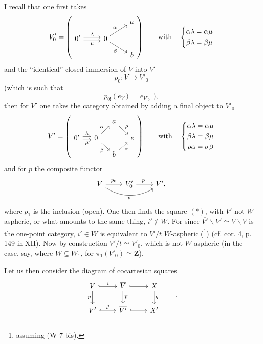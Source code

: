 \documentclass[11pt]{article}
\newcommand{\printedpage}[1]{\marginpar{\footnotesize p.~#1}}
\newcommand{\msp}[1]{\marginpar{\footnotesize [#1]}}
\begin{document}
I recall that one first takes
\printedpage{11}
\[
V'_0 = \left(
\begin{tikzcd}[row sep=small]
 & & a \\
0' \arrow[r, shift left, "\lambda"] \arrow[r, shift right, "\mu"'] & 0 \arrow[ur, "\alpha"] \arrow[dr, "\beta"'] & \\
 & & b
\end{tikzcd}
\right)
\qquad \text{with} \quad
\left\{
\begin{aligned}
\alpha\lambda &= \alpha\mu \\
\beta\lambda &= \beta\mu
\end{aligned}
\right.
\]
and the ``identical'' closed immersion of $V$ into $V'$
\[ p_0 : V \longrightarrow V'_0 \]
\msp{page 15}(which is such that
\[ p_{0!}(e_V) = e_{V'_0} \ \ ), \]
then for $V'$ one takes the category obtained by adding a final object to $V'_0$
\[
V' = \left(
\begin{tikzcd}[row sep=small, column sep=small]
 & & a \arrow[dr, "\rho"] & \\
0' \arrow[r, shift left, "\lambda"] \arrow[r, shift right, "\mu"'] & 0 \arrow[ur, "\alpha"] \arrow[dr, "\beta"'] & & e \\
 & & b \arrow[ur, "\sigma"'] &
\end{tikzcd}
\right)
\qquad \text{with} \quad
\left\{
\begin{aligned}
\alpha\lambda &= \alpha\mu \\
\beta\lambda &= \beta\mu \\
\rho\alpha &= \sigma\beta
\end{aligned}
\right.
\]
and for $p$ the composite functor
\[
\begin{tikzcd}
V \arrow[r, "p_0"] \arrow[rr, bend right, "p"'] & V'_0 \arrow[r, "p_1"] & V',
\end{tikzcd}
\]
where $p_1$ is the inclusion (open). One then finds the square $(*)$, with $\overline{V'}$ not $W$-aspheric, or what amounts to the same thing, $i' \notin W$. For since $\overline{V'}\backslash V' \simeq \overline{V}\backslash V$ is the one-point category, $i' \in W$ is equivalent to $V'/t$ $W$-aspheric (\footnote[8]{assuming (W 7 bis).}) (cf. cor. 4, p. 149 in XII). Now by construction $V'/t \simeq V'_0$, which is not $W$-aspheric (in the case, say, where $W \subseteq W_1$, for $\pi_1(V'_0) \simeq \mathbf{Z}$).

\msp{page 16}Let us then consider the diagram of cocartesian squares
\[
\begin{tikzcd}
V \arrow[r, hook, "i"] \arrow[d, "p"'] & \overline{V} \arrow[r, hook] \arrow[d, "\overline{p}"] & X \arrow[d, "q"] \\
V' \arrow[r, hook, "i'"] & \overline{V'} \arrow[r, hook] & X'
\end{tikzcd}
\qquad .
\]
\end{document}
